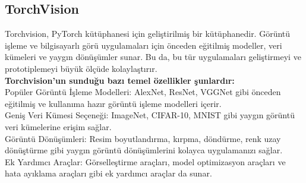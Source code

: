 \documentclass[12pt, a4paper]{article}
\begin{document}
	\subsection{TorchVision}
	Torchvision, PyTorch kütüphanesi için geliştirilmiş bir kütüphanedir. Görüntü işleme ve bilgisayarlı görü uygulamaları için önceden eğitilmiş modeller, veri kümeleri ve yaygın dönüşümler sunar. Bu da, bu tür uygulamaları geliştirmeyi ve prototiplemeyi büyük ölçüde kolaylaştırır.\\
	\textbf{Torchvision'un sunduğu bazı temel özellikler şunlardır:}\\
	Popüler Görüntü İşleme Modelleri: AlexNet, ResNet, VGGNet gibi önceden eğitilmiş ve kullanıma hazır görüntü işleme modelleri içerir.\\
	Geniş Veri Kümesi Seçeneği: ImageNet, CIFAR-10, MNIST gibi yaygın görüntü veri kümelerine erişim sağlar.\\
	Görüntü Dönüşümleri: Resim boyutlandırma, kırpma, döndürme, renk uzay dönüştürme gibi yaygın görüntü dönüşümlerini kolayca uygulamanızı sağlar.\\
	Ek Yardımcı Araçlar: Görselleştirme araçları, model optimizasyon araçları ve hata ayıklama araçları gibi ek yardımcı araçlar da sunar.
\end{document}
